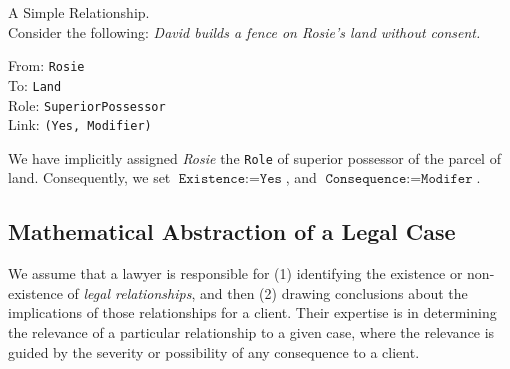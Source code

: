 \documentclass{article}
\newcounter{pic}[page]
\numberwithin{equation}{section}
\begin{document}
\begin{example}{A Simple Relationship.}\label{david-builds-a-fence-on-patricias-land} ~\\
\textnormal{Consider the following: \textit{David builds a fence on Rosie's land without consent.}}

\vspace{0.25cm}

\begin{minipage}{0.45\textwidth}
\begin{tcolorbox}[left=1pt,right=2pt,top=1pt,bottom=0pt]
	From: \texttt{Rosie} \\
	To: \texttt{Land} \\
	Role: \texttt{SuperiorPossessor} \\
	Link: \texttt{(Yes, Modifier)}
\end{tcolorbox}
\end{minipage}
\hspace{0.75cm}
\begin{minipage}{0.45\textwidth}
\end{minipage}


\textnormal{
We have implicitly assigned \textit{Rosie} the \texttt{Role} of superior possessor of the parcel of land. Consequently, we set $\texttt{Existence} := \texttt{Yes}$, and $\texttt{Consequence} := \texttt{Modifer}$.
}

\end{example}


\subsection{Mathematical Abstraction of a Legal Case}


We assume that a lawyer is responsible for (1) identifying the existence or non-existence of \textit{legal relationships}, and then (2) drawing conclusions about the implications of those relationships for a client. Their expertise is in determining the relevance of a particular relationship to a given case, where the relevance is guided by the severity or possibility of any consequence to a client.
\end{document}
